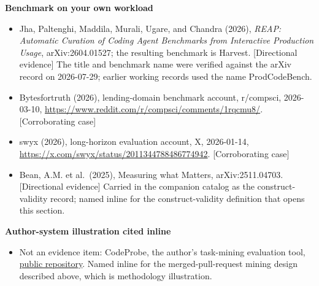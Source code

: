 \textbf{Benchmark on your own workload}

\begin{itemize}
\tightlist
\item
  Jha, Paltenghi, Maddila, Murali, Ugare, and Chandra (2026), \emph{REAP: Automatic Curation of Coding Agent Benchmarks from Interactive Production Usage}, arXiv:2604.01527; the resulting benchmark is Harvest. {[}Directional evidence{]} The title and benchmark name were verified against the arXiv record on 2026-07-29; earlier working records used the name ProdCodeBench.
\item
  Bytesfortruth (2026), lending-domain benchmark account, r/compsci, 2026-03-10, \url{https://www.reddit.com/r/compsci/comments/1rqcmu8/}. {[}Corroborating case{]}
\item
  swyx (2026), long-horizon evaluation account, X, 2026-01-14, \url{https://x.com/swyx/status/2011344788486774942}. {[}Corroborating case{]}
\item
  Bean, A.M. et al.~(2025), Measuring what Matters, arXiv:2511.04703. {[}Directional evidence{]} Carried in the companion catalog as the construct-validity record; named inline for the construct-validity definition that opens this section.
\end{itemize}

\textbf{Author-system illustration cited inline}

\begin{itemize}
\tightlist
\item
  Not an evidence item: CodeProbe, the author's task-mining evaluation tool, \href{https://github.com/sjarmak/codeprobe}{public repository}. Named inline for the merged-pull-request mining design described above, which is methodology illustration.
\end{itemize}
